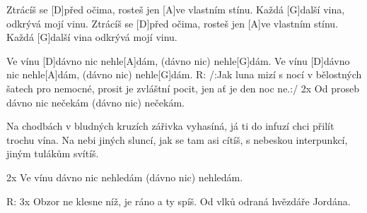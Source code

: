 
Ztrácíš se [D]před očima, rosteš jen [A]ve vlastním stínu.
Každá [G]další vina, odkrývá mojí vinu.
Ztrácíš se [D]před očima, rosteš jen [A]ve vlastním stínu.
Každá [G]další vina odkrývá mojí vinu.

Ve vínu [D]dávno nic nehle[A]dám, (dávno nic) nehle[G]dám.
Ve vínu [D]dávno nic nehle[A]dám, (dávno nic) nehle[G]dám.
R:
/:Jak luna mizí s nocí v bělostných šatech pro nemocné,
prosit je zvláštní pocit, jen ať je den noc ne.:/
2x Od proseb dávno nic nečekám (dávno nic) nečekám.

Na chodbách v bludných kruzích zářivka vyhasíná,
já ti do infuzí chci přilít trochu vína.
Na nebi jiných sluncí, jak se tam asi cítíš,
s nebeskou interpunkcí, jiným tulákům svítíš.

2x Ve vínu dávno nic nehledám (dávno nic) nehledám.

R:
3x Obzor ne klesne níž, je ráno a ty spíš.
Od vlků odraná hvězdáře Jordána.